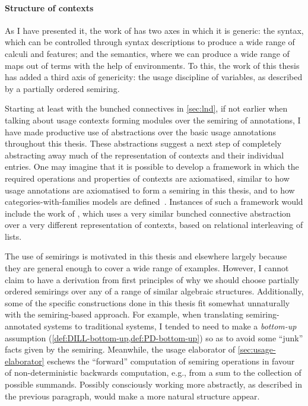 
\paragraph{Structure of contexts}
As I have presented it, the work of \citet{AACMM21} has two axes in which it is
generic: the syntax, which can be controlled through syntax descriptions to
produce a wide range of calculi and features; and the semantics, where we can
produce a wide range of maps out of terms with the help of environments.
To this, the work of this thesis has added a third axis of genericity: the usage
discipline of variables, as described by a partially ordered semiring.

Starting at least with the bunched connectives in \cref{sec:lnd}, if not earlier
when talking about usage contexts forming modules over the semiring of
annotations, I have made productive use of abstractions over the basic usage
annotations throughout this thesis.
These abstractions suggest a next step of completely abstracting away much of
the representation of contexts and their individual entries.
One may imagine that it is possible to develop a framework in which the required
operations and properties of contexts are axiomatised, similar to how usage
annotations are axiomatised to form a semiring in this thesis, and to how
categories-with-families models are defined~\citep{Dybjer95,CCD19}.
Instances of such a framework would include the work of \citet{RPKV20}, which
uses a very similar bunched connective abstraction over a very different
representation of contexts, based on relational interleaving of lists.

The use of semirings is motivated in this thesis and elsewhere largely because
they are general enough to cover a wide range of examples.
However, I cannot claim to have a derivation from first principles of why we
should choose partially ordered semirings over any of a range of similar
algebraic structures.
Additionally, some of the specific constructions done in this thesis fit
somewhat unnaturally with the semiring-based approach.
For example, when translating semiring-annotated systems to traditional systems,
I tended to need to make a \emph{bottom-up} assumption
(\cref{def:DILL-bottom-up,def:PD-bottom-up}) so as to avoid some ``junk'' facts
given by the semiring.
Meanwhile, the usage elaborator of \cref{sec:usage-elaborator} eschews the
``forward'' computation of semiring operations in favour of non-deterministic
backwards computation, e.g., from a sum to the collection of possible summands.
Possibly consciously working more abstractly, as described in the previous
paragraph, would make a more natural structure appear.

